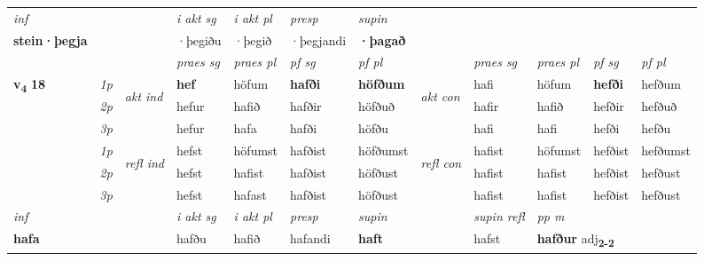 \begin{longtable}[l]{X>{\footnotesize\itshape}llXXXXlXXXX}
   {\textit{inf}} & &  & \textit{i akt sg} & \textit{i akt pl}   & \textit{presp} & \textit{supin}   \\*
  {\textbf{stein\allowbreak ·þegja}} & && ·þegiðu  & ·þegið   & ·þegjandi &  \textbf{·þagað}   \\*

\midrule

 & &   & \textit{praes sg}  & \textit{praes pl}    & \textit{ pf sg} & \textit{pf pl} & & \textit{praes sg}  & \textit{praes pl}    & \textit{pf sg} & \textit{pf pl }  \\ \cmidrule{4-7} \cmidrule{9-12}
 \multirow{2}{*}{{{\textbf{v{\textsubscript{4}}} \Large{\textbf{18}}}}}  & 1p & \multirow{3}{*}{\begin{turn}{90}\textit{akt ind}\end{turn}} & \textbf{hef} & höfum & \textbf{hafði} & \textbf{höfðum} & \multirow{3}{*}{\begin{turn}{90}\textit{akt con}\end{turn}} &hafi & höfum & \textbf{hefði} & hefðum\\*
 & 2p &  &  hefur  & hafið & hafðir & höfðuð & & hafir & hafið & hefðir & hefðuð \\*
 & 3p &  & hefur & hafa & hafði & höfðu & & hafi & hafi& hefði & hefðu \\*
\cmidrule{4-7} \cmidrule{9-12}
 & 1p & \multirow{3}{*}{\begin{turn}{90}\textit{refl ind}\end{turn}}  & hefst & höfumst & hafðist & höfðumst & \multirow{3}{*}{\begin{turn}{90}\textit{refl con}\end{turn}}  &hafist & höfumst & hefðist & hefðumst \\*
 & 2p &  & hefst & hafist & hafðist & höfðust & &hafist & hafist & hefðist & hefðust \\*
 & 3p  & & hefst & hafast & hafðist & höfðust & & hafist & hafist& hefðist & hefðust \\*
\cmidrule{4-7} \cmidrule{9-12}

   {\textit{inf}} & &  & \textit{i akt sg} & \textit{i akt pl}   & \textit{presp} & \textit{supin} && \textit{supin refl} & \textit{pp m} \\*
  {\textbf{hafa}} & && hafðu  & hafið   & hafandi &  \textbf{haft} && hafst & \multicolumn{2}{l}{\textbf{hafður} adj\textbf{\textsubscript{2-2}}} \\*

\midrule


\end{longtable}
